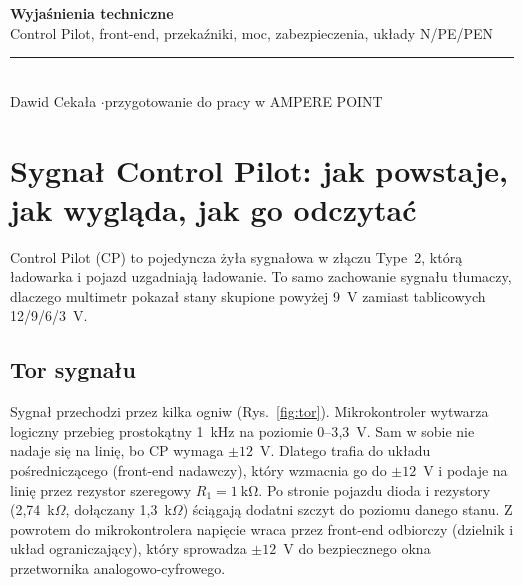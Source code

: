 \documentclass[11pt]{article}
\begin{document}
\begin{center}
{\sffamily\bfseries\LARGE Wyjaśnienia techniczne}\\[3pt]
{\sffamily\large Control Pilot, front-end, przekaźniki, moc, zabezpieczenia, układy N/PE/PEN}\\[5pt]
{\color{grey}\rule{0.8\linewidth}{0.8pt}}\\[3pt]
{\sffamily\small Dawid Cekała \quad$\cdot$\quad przygotowanie do pracy w AMPERE POINT}
\end{center}
\vspace{0.5em}
{\small\tableofcontents}
\newpage

\section{Sygnał Control Pilot: jak powstaje, jak wygląda, jak go odczytać}

Control Pilot (CP) to pojedyncza żyła sygnałowa w złączu Type~2, którą ładowarka i pojazd uzgadniają ładowanie. To samo zachowanie sygnału tłumaczy, dlaczego multimetr pokazał stany skupione powyżej 9~V zamiast tablicowych 12/9/6/3~V.

\subsection{Tor sygnału}

Sygnał przechodzi przez kilka ogniw (Rys.~\ref{fig:tor}). Mikrokontroler wytwarza logiczny przebieg prostokątny 1~kHz na poziomie 0--3{,}3~V. Sam w sobie nie nadaje się na linię, bo CP wymaga $\pm12$~V. Dlatego trafia do układu pośredniczącego (front-end nadawczy), który wzmacnia go do $\pm12$~V i podaje na linię przez rezystor szeregowy $R_1=1\ \mathrm{k\Omega}$. Po stronie pojazdu dioda i rezystory (2{,}74~k$\Omega$, dołączany 1{,}3~k$\Omega$) ściągają dodatni szczyt do poziomu danego stanu. Z powrotem do mikrokontrolera napięcie wraca przez front-end odbiorczy (dzielnik i układ ograniczający), który sprowadza $\pm12$~V do bezpiecznego okna przetwornika analogowo-cyfrowego.
\end{document}
